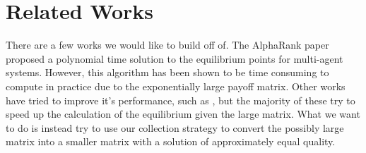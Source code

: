 \documentclass{article}
\begin{document}
\section{Related Works}
There are a few works we would like to build off of. The AlphaRank paper
proposed a polynomial time solution to the equilibrium points for multi-agent
systems. \cite{alpha} However, this algorithm has been shown to be time
consuming to compute in practice due to the exponentially large payoff matrix.
Other works have tried to improve it's performance, such as \cite{alphalpha},
but the majority of these try to speed up the calculation of the equilibrium
given the large matrix. What we want to do is instead try to use our collection
strategy to convert the possibly large matrix into a smaller matrix with a
solution of approximately equal quality.




\end{document}
